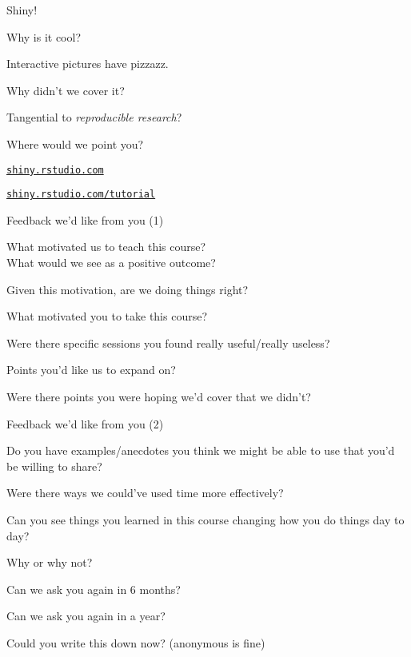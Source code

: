 \documentclass[12pt,t]{beamer}
\begin{document}
\begin{frame}[c]{Shiny!}

  \bbi
\item[] Why is it cool?
  \bi
\item Interactive pictures have pizzazz.
  \ei
\item[] Why didn't we cover it?
    \bi
    \item Tangential to \emph{reproducible research}?
    \ei
\item[] Where would we point you?
    \bi
  \item \href{http://shiny.rstudio.com/}{\tt shiny.rstudio.com}
  \item \href{http://shiny.rstudio.com/tutorial}{\tt shiny.rstudio.com/tutorial}
   \ei
\ei


\end{frame}










\begin{frame}[c]{Feedback we'd like from you (1)}

  {\lolit What motivated us to teach this course? \\
  What would we see as a positive outcome? \\[18pt]}

  \bi
\item Given this motivation, are we doing things right?
\item What motivated you to take this course?
\item Were there specific sessions you found really useful/really
    useless?
  \item Points you'd like us to expand on?
  \item Were there points you were hoping we'd cover that we didn't?
    \ei

  \note{}


\end{frame}



\begin{frame}[c]{Feedback we'd like from you (2)}

  \bi
\item Do you have examples/anecdotes you think we might be able to use
  that you'd be willing to share?
\item Were there ways we could've used time more effectively?
  \item Can you see things you learned in this course changing how you
    do things day to day?
    \bi
  \item Why or why not?
  \item Can we ask you again in 6 months?
  \item Can we ask you again in a year?
    \ei

 \item Could you write this down now? (anonymous is fine)
    \ei

  \note{}


\end{frame}
\end{document}
